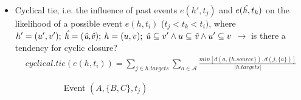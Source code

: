 \begin{itemize}
\begin{itemize}
		\item Cyclical tie, i.e. the influence of past events $e(h',t_j)$ and $e(\text{\emph{\^h}},t_k)$ on the likelihood of a possible event $e(h,t_i)$ ($t_j < t_k < t_i)$, where $h' = (u',v'); \: \text{\emph{\^h}} = (\text{\emph{\^u,\^v}}); \: h = (u,v); \: \text{\emph{\^u}} \subseteq v' \land u \subseteq \text{\emph{\^v}} \land u' \subseteq v$ $\rightarrow$ is there a tendency for cyclic closure?
		\begin{align*}
			cyclical.tie(e(h,t_i)) = \sum_{j \in h.targets} \sum_{a \in \mathcal{A}} \frac{min[d(a,\{h.source\}),d(j,\{a\})]}{\lvert h.targets \rvert}
		\end{align*}
		\begin{figure}
			\begin{mdframed}
				\centering
				\begin{subfigure}[t]{0.3\linewidth}
					\vskip 0pt
					\caption{Event $(A,\{B,C\},t_j)$}
				\end{subfigure}
				\hfill
				\begin{subfigure}[t]{0.3\linewidth}
					\vskip 0pt
\end{subfigure}
\end{mdframed}
\end{figure}
\end{itemize}
\end{itemize}
